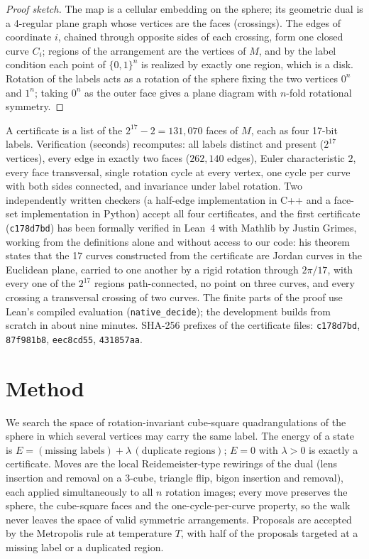\documentclass[11pt]{article}
\begin{document}
\begin{proof}[Proof sketch]
The map is a cellular embedding on the sphere; its geometric dual is a 4-regular plane graph whose vertices are the
faces (crossings). The edges of coordinate $i$, chained through opposite sides of each crossing, form one closed curve
$C_i$; regions of the arrangement are the vertices of $M$, and by the label condition each point of $\{0,1\}^n$ is
realized by exactly one region, which is a disk. Rotation of the labels acts as a rotation of the sphere fixing the
two vertices $0^n$ and $1^n$; taking $0^n$ as the outer face gives a plane diagram with $n$-fold rotational symmetry.
\end{proof}

A certificate is a list of the $2^{17}-2 = 131{,}070$ faces of $M$, each as four 17-bit labels. Verification
(seconds) recomputes: all labels distinct and present ($2^{17}$ vertices), every edge in exactly two faces
($262{,}140$ edges), Euler characteristic $2$, every face transversal, single rotation cycle at every vertex, one cycle
per curve with both sides connected, and invariance under label rotation. Two independently written checkers
(a half-edge implementation in C++ and a face-set implementation in Python) accept all four certificates, and the
first certificate (\texttt{c178d7bd}) has been formally verified in Lean~4 with Mathlib by Justin Grimes, working
from the definitions alone and without access to our code: his theorem states that the 17 curves constructed from
the certificate are Jordan curves in the Euclidean plane, carried to one another by a rigid rotation through
$2\pi/17$, with every one of the $2^{17}$ regions path-connected, no point on three curves, and every crossing a
transversal crossing of two curves. The finite parts of the proof use Lean's compiled evaluation
(\texttt{native\_decide}); the development builds from scratch in about nine minutes.
SHA-256 prefixes of the certificate files: \texttt{c178d7bd}, \texttt{87f981b8}, \texttt{eec8cd55}, \texttt{431857aa}.

\section{Method}
We search the space of rotation-invariant cube-square quadrangulations of the sphere in which several vertices
may carry the same label. The energy of a state is $E = (\text{missing labels}) + \lambda\,(\text{duplicate regions})$;
$E=0$ with $\lambda>0$ is exactly a certificate. Moves are the local Reidemeister-type rewirings of the dual
(lens insertion and removal on a 3-cube, triangle flip, bigon insertion and removal), each applied simultaneously to
all $n$ rotation images; every move preserves the sphere, the cube-square faces and the one-cycle-per-curve property,
so the walk never leaves the space of valid symmetric arrangements. Proposals are accepted by the Metropolis rule at
temperature $T$, with half of the proposals targeted at a missing label or a duplicated region.
\end{document}
